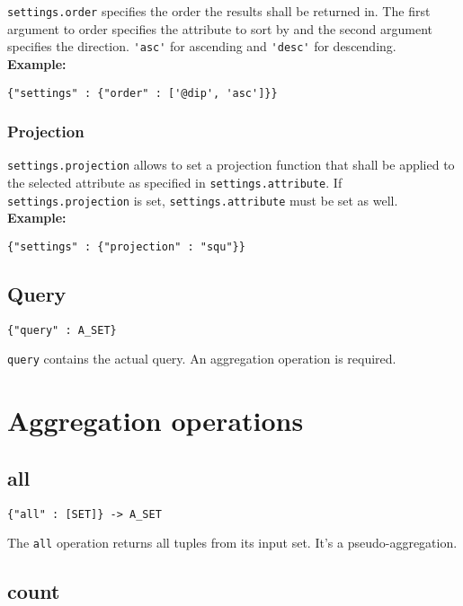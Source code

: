 \documentclass[a4paper]{article}
\begin{document}
\verb|settings.order| specifies the order the results shall be
returned in. The first argument to order specifies the attribute to
sort by and the second argument specifies the direction.
\verb|'asc'| for ascending and \verb|'desc'| for descending.\\

\textbf{Example:}
\begin{verbatim}
{"settings" : {"order" : ['@dip', 'asc']}}
\end{verbatim}

\subsubsection{Projection}

\verb|settings.projection| allows to set a projection function that
shall be applied to the selected attribute as specified in
\verb|settings.attribute|. If \verb|settings.projection| is set,
\verb|settings.attribute| must be set as well. \\

\textbf{Example:}
\begin{verbatim}
{"settings" : {"projection" : "squ"}}
\end{verbatim}

\subsection{Query}

\begin{verbatim}
{"query" : A_SET}
\end{verbatim}

\verb|query| contains the actual query. An aggregation operation is required.

\section{Aggregation operations}

\subsection{all}

\begin{verbatim}
{"all" : [SET]} -> A_SET
\end{verbatim}

The \verb|all| operation returns all tuples from its input set. It's a pseudo-aggregation.

\subsection{count}
\end{document}
